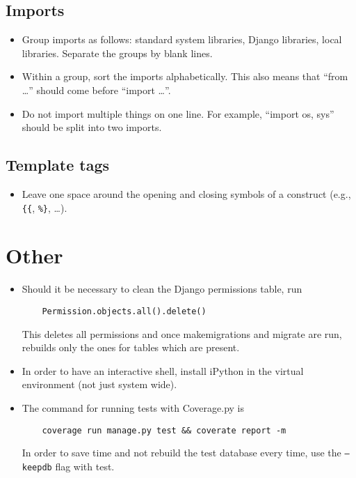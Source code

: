 \documentclass{article}
\begin{document}
\subsection{Imports}

\begin{itemize}
\item Group imports as follows: standard system libraries, Django libraries, local libraries. Separate the groups by blank lines.
\item Within a group, sort the imports alphabetically. This also means that ``from \ldots'' should come before ``import \ldots''.
\item Do not import multiple things on one line. For example, ``import os, sys'' should be split into two imports.
\end{itemize}

\subsection{Template tags}

\begin{itemize}
\item Leave one space around the opening and closing symbols of a construct (e.g., \verb+{{+, \verb+%}+, \ldots).
\end{itemize}

\section{Other}

\begin{itemize}
\item Should it be necessary to clean the Django permissions table, run
  \begin{lstlisting}
    Permission.objects.all().delete()
  \end{lstlisting}
  This deletes all permissions and once makemigrations and migrate are run, rebuilds only the ones for tables which are present.
\item In order to have an interactive shell, install iPython in the virtual environment (not just system wide).
\item The command for running tests with Coverage.py is
  \begin{lstlisting}
    coverage run manage.py test && coverate report -m
  \end{lstlisting}
  In order to save time and not rebuild the test database every time, use the \texttt{--keepdb} flag with test.
\end{itemize}
\end{document}
